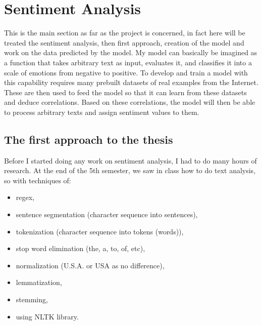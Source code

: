 \section{Sentiment Analysis}
This is the main section as far as the project is concerned, in fact here will be treated the sentiment analysis, then first approach, creation of the model and work on the data predicted by the model.
My model can basically be imagined as a function that takes arbitrary text as input, evaluates it, and classifies it into a scale of emotions from negative to positive.
To develop and train a model with this capability requires many prebuilt datasets of real examples from the Internet. These are then used to feed the model so that it can learn from these datasets and deduce correlations. Based on these correlations, the model will then be able to process arbitrary texts and assign sentiment values to them.

\subsection{The first approach to the thesis}
Before I started doing any work on sentiment analysis, I had to do many hours of research.
At the end of the 5th semester, we saw in class how to do text analysis, so with techniques of:
\begin{itemize}
    \item regex,
    \item sentence segmentation (character sequence into sentences), 
    \item tokenization (character sequence into tokens (words)),
    \item stop word elimination (the, a, to, of, etc),
    \item normalization (U.S.A. or USA as no difference),
    \item lemmatization,
    \item stemming,
    \item using NLTK library.
\end{itemize}

